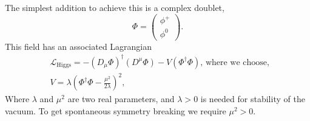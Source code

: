 The simplest addition to achieve this is a complex doublet,
\begin{equation}\label{eqn:phi_hfield}
\Phi = \begin{pmatrix} \phi^{+} \\
\phi^{0} \end{pmatrix}.
\end{equation}
This field has an associated Lagrangian
\begin{equation}\label{eqn:higgs_gen_lag}
\begin{split}
&\mathcal{L}_{\text{Higgs}} = -(D_{\mu}\Phi)^{\dagger}(D^{\mu}\Phi) - V(\Phi^{\dagger}\Phi) \text{, where we choose, }\\
&V = \lambda(\Phi^{\dagger}\Phi - \frac{\mu^2}{2\lambda})^2,
\end{split}
\end{equation}
Where $\lambda$ and $\mu^2$ are two real parameters, and $\lambda>0$ is needed for stability
of the vacuum. To get spontaneous symmetry breaking we require $\mu^2>0$.

